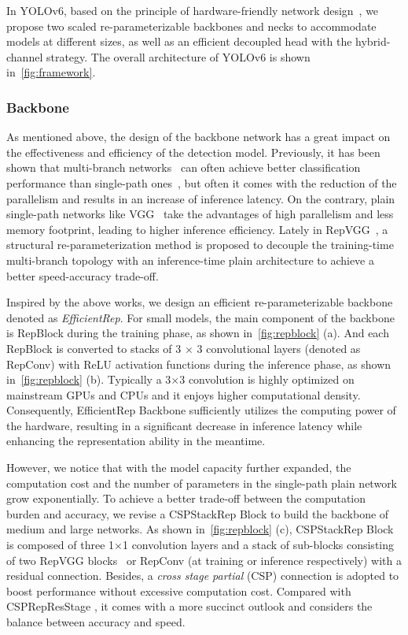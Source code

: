 \documentclass[10pt,twocolumn,letterpaper]{article}
\begin{document}
  In YOLOv6, based on the principle of hardware-friendly network design~\cite{ding2021repvgg}, we propose two scaled re-parameterizable backbones and necks to accommodate models at different sizes, as well as an efficient decoupled head with the hybrid-channel strategy. The overall architecture of YOLOv6 is shown in~\cref{fig:framework}. 

\subsubsection{Backbone}
\label{sec:method:backbone}
As mentioned above, the design of the backbone network has a great impact on the effectiveness and efficiency of the detection model. Previously, it has been shown that multi-branch networks~\cite{szegedy2015going,szegedy2016rethinking,he2016identity,huang2017densely} can often achieve better classification performance than single-path ones~\cite{krizhevsky2012imagenet, simonyan2014very}, but often it comes with the reduction of the parallelism and results in an increase of inference latency. On the contrary, plain single-path networks like VGG~\cite{simonyan2014very} take the advantages of high parallelism and less memory footprint, leading to higher inference efficiency. Lately in RepVGG~\cite{ding2021repvgg}, a structural re-parameterization method is proposed to decouple the training-time multi-branch topology with an inference-time plain architecture to achieve a better speed-accuracy trade-off. 

Inspired by the above works, we design an efficient re-parameterizable backbone denoted as \emph{EfficientRep}. For small models, the main component of the backbone is RepBlock during the training phase, as shown in~\cref{fig:repblock} (a). And each RepBlock is converted to stacks of 3 $\times$ 3 convolutional layers (denoted as RepConv) with ReLU activation functions during the inference phase, as shown in~\cref{fig:repblock} (b). Typically a 3$\times$3 convolution is highly optimized on mainstream GPUs and CPUs and it enjoys higher computational density. Consequently, EfficientRep Backbone sufficiently utilizes the computing power of the hardware, resulting in a significant decrease in inference latency while enhancing the representation ability in the meantime.

However, we notice that with the model capacity further expanded, the computation cost and the number of parameters in the single-path plain network grow exponentially. To achieve a better trade-off between the computation burden and accuracy, we revise a CSPStackRep Block to build the backbone of medium and large networks. As shown in~\cref{fig:repblock} (c), CSPStackRep Block is composed of three 1$\times$1 convolution layers and a stack of sub-blocks consisting of two RepVGG blocks~\cite{ding2021repvgg} or RepConv (at training or inference respectively) with a residual connection. Besides, a \emph{cross stage partial} (CSP) connection is adopted to boost performance without excessive computation cost. Compared with CSPRepResStage \cite{xu2022ppyoloe}, it comes with a more succinct outlook and considers the balance between accuracy and speed.
\end{document}
